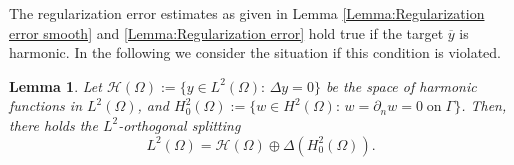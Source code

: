 \documentclass{article}
\newtheorem{lemma}{Lemma}
\numberwithin{equation}{section}
\begin{document}
\noindent
The regularization error estimates as given in Lemma
\ref{Lemma:Regularization error smooth} and \ref{Lemma:Regularization error} 
hold true if the target $\overline{y}$ is harmonic. In the following we
consider the situation if this condition is violated.

\begin{lemma}
  Let $\mathcal{H}(\Omega):= \{y\in L^2(\Omega):\, \Delta y=0\}$ be the
  space of harmonic functions in $L^2(\Omega)$, and $H_0^2(\Omega):=
  \{w\in H^2(\Omega):\, w =\partial_nw =0 \; \mbox{on} \; \Gamma \}$.
  Then, there holds the $L^2$-orthogonal splitting
  \begin{equation*}
    L^2(\Omega) = \mathcal{H}(\Omega) \oplus \Delta (H^2_0(\Omega)).
  \end{equation*}
\end{lemma}
\end{document}
